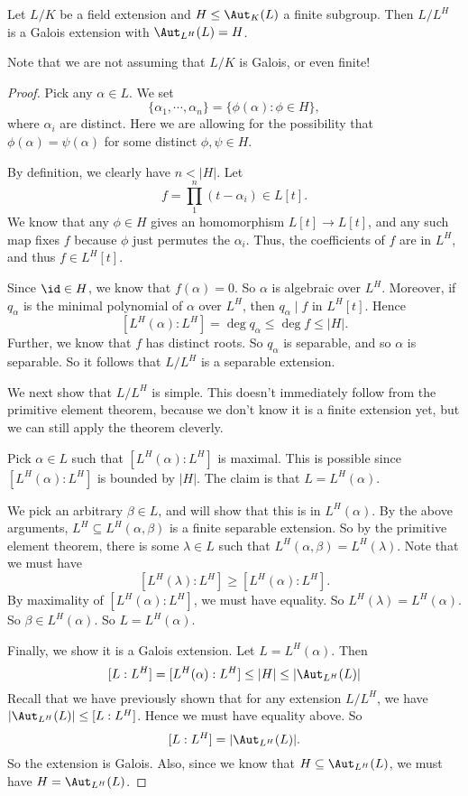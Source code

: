 \documentclass[a4paper]{article}
\begin{document}
\begin{lemma}
  Let $L/K$ be a field extension and $H\leq \Aut_K(L)$ a finite subgroup. Then $L/L^H$ is a Galois extension with $\Aut_{L^H}(L) = H$.
\end{lemma}
Note that we are not assuming that $L/K$ is Galois, or even finite!
\begin{proof}
  Pick any $\alpha \in L$. We set
  \[
    \{\alpha_1,\cdots, \alpha_n\} = \{\phi(\alpha): \phi \in H\},
  \]
  where $\alpha_i$ are distinct. Here we are allowing for the possibility that $\phi(\alpha) = \psi(\alpha)$ for some distinct $\phi, \psi \in H$.

  By definition, we clearly have $n < |H|$. Let
  \[
    f = \prod_1^n (t - \alpha_i) \in L[t].
  \]
  We know that any $\phi \in H$ gives an homomorphism $L[t] \to L[t]$, and any such map fixes $f$ because $\phi$ just permutes the $\alpha_i$. Thus, the coefficients of $f$ are in $L^H$, and thus $f \in L^H[t]$.

  Since $\id \in H$, we know that $f(\alpha) = 0$. So $\alpha$ is algebraic over $L^H$. Moreover, if $q_\alpha$ is the minimal polynomial of $\alpha$ over $L^H$, then $q_\alpha \mid f$ in $L^H[t]$. Hence
  \[
    [L^H(\alpha): L^H] = \deg q_\alpha \leq \deg f \leq |H|.
  \]
  Further, we know that $f$ has distinct roots. So $q_\alpha$ is separable, and so $\alpha$ is separable. So it follows that $L/L^H$ is a separable extension.

  We next show that $L/L^H$ is simple. This doesn't immediately follow from the primitive element theorem, because we don't know it is a finite extension yet, but we can still apply the theorem cleverly.

  Pick $\alpha \in L$ such that $[L^H(\alpha): L^H]$ is maximal. This is possible since $[L^H(\alpha):L^H]$ is bounded by $|H|$. The claim is that $L = L^H(\alpha)$.

  We pick an arbitrary $\beta \in L$, and will show that this is in $L^H(\alpha)$. By the above arguments, $L^H\subseteq L^H(\alpha, \beta)$ is a finite separable extension. So by the primitive element theorem, there is some $\lambda \in L$ such that $L^H(\alpha, \beta) = L^H(\lambda)$. Note that we must have
  \[
    [L^H(\lambda): L^H] \geq [L^H(\alpha): L^H].
  \]
  By maximality of $[L^H(\alpha): L^H]$, we must have equality. So $L^H(\lambda) = L^H(\alpha)$. So $\beta \in L^H(\alpha)$. So $L = L^H(\alpha)$.

  Finally, we show it is a Galois extension. Let $L = L^H(\alpha)$. Then
  \[
    [L:L^H] = [L^H(\alpha): L^H] \leq |H| \leq |\Aut_{L^H}(L)|
  \]
  Recall that we have previously shown that for any extension $L/L^H$, we have $|\Aut_{L^H}(L)| \leq [L:L^H]$. Hence we must have equality above. So
  \[
    [L:L^H] = |\Aut_{L^H}(L)|.
  \]
  So the extension is Galois. Also, since we know that $H\subseteq \Aut_{L^H}(L)$, we must have $H = \Aut_{L^H}(L)$.
\end{proof}
\end{document}
